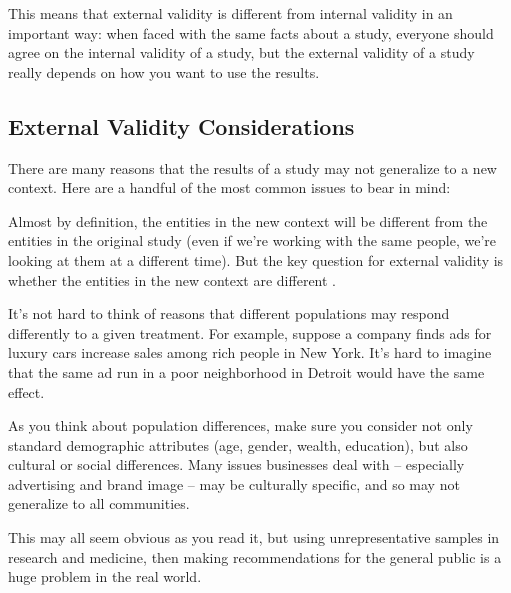 \documentclass[letterpaper,10pt,english]{jupyterBook}
\begin{document}
\sphinxAtStartPar
This means that external validity is different from internal validity in an important way: when faced with the same facts about a study, everyone should  agree on the internal validity of a study, but the external validity of a study really depends on how you want to use the results.


\subsection{External Validity Considerations}
\label{\detokenize{30_questions/17_exploratory_questions_internal_external:external-validity-considerations}}
\sphinxAtStartPar
There are many reasons that the results of a study may not generalize to a new context. Here are a handful of the most common issues to bear in mind:

\sphinxAtStartPar
{}

\sphinxAtStartPar
Almost by definition, the entities in the new context will be different from the entities in the original study (even if we’re working with the same people, we’re looking at them at a different time). But the key question for external validity is whether the entities in the new context are different .

\sphinxAtStartPar
It’s not hard to think of reasons that different populations may respond differently to a given treatment. For example, suppose a company finds ads for luxury cars increase sales among rich people in New York. It’s hard to imagine that the same ad run in a poor neighborhood in Detroit would have the same effect.

\sphinxAtStartPar
As you think about population differences, make sure you consider not only standard demographic attributes (age, gender, wealth, education), but also cultural or social differences. Many issues businesses deal with – especially advertising and brand image – may be culturally specific, and so may not generalize to all communities.

\sphinxAtStartPar
This may all seem obvious as you read it, but using unrepresentative samples in research and medicine, then making recommendations for the general public is a huge problem in the real world.
\end{document}
